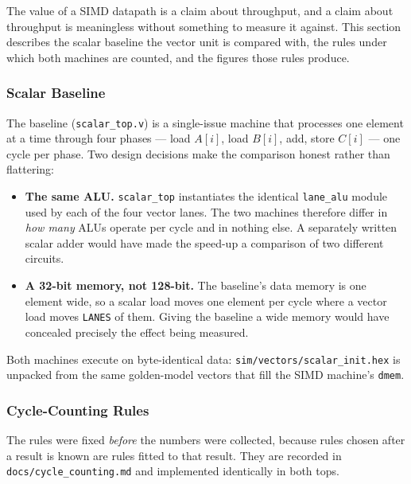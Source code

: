 
The value of a SIMD datapath is a claim about throughput, and a claim about
throughput is meaningless without something to measure it against. This section
describes the scalar baseline the vector unit is compared with, the rules under
which both machines are counted, and the figures those rules produce.

\subsubsection{Scalar Baseline}
The baseline (\texttt{scalar\_top.v}) is a single-issue machine that processes
one element at a time through four phases --- load $A[i]$, load $B[i]$, add,
store $C[i]$ --- one cycle per phase. Two design decisions make the comparison
honest rather than flattering:

\begin{itemize}
  \item \textbf{The same ALU.} \texttt{scalar\_top} instantiates the identical
        \texttt{lane\_alu} module used by each of the four vector lanes. The two
        machines therefore differ in \emph{how many} ALUs operate per cycle and
        in nothing else. A separately written scalar adder would have made the
        speed-up a comparison of two different circuits.
  \item \textbf{A 32-bit memory, not 128-bit.} The baseline's data memory is one
        element wide, so a scalar load moves one element per cycle where a
        vector load moves \texttt{LANES} of them. Giving the baseline a wide
        memory would have concealed precisely the effect being measured.
\end{itemize}

Both machines execute on byte-identical data: \texttt{sim/vectors/scalar\_init.hex}
is unpacked from the same golden-model vectors that fill the SIMD machine's
\texttt{dmem}.

\subsubsection{Cycle-Counting Rules}
The rules were fixed \emph{before} the numbers were collected, because rules
chosen after a result is known are rules fitted to that result. They are
recorded in \texttt{docs/cycle\_counting.md} and implemented identically in both
tops.

